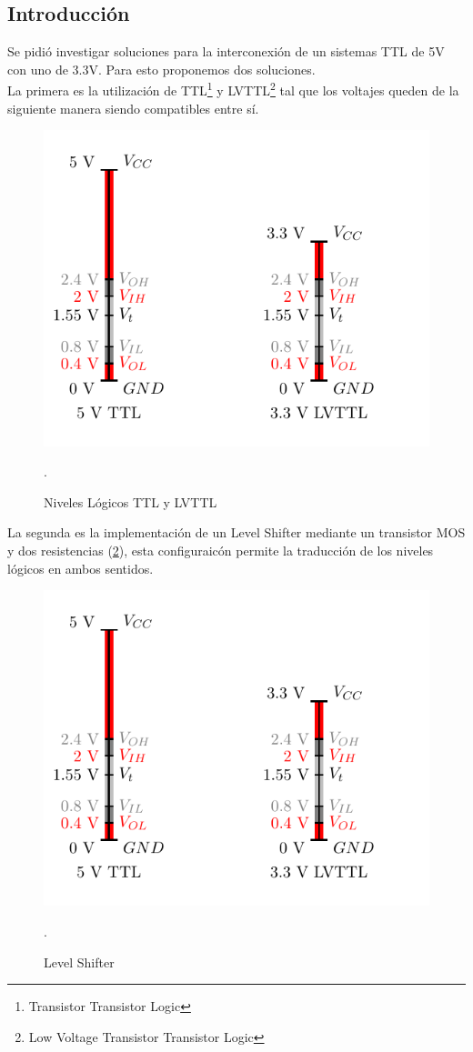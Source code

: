 



\subsection{Introducción}
Se pidió investigar soluciones para la interconexión de un sistemas TTL de 5V con uno de 3.3V. Para esto proponemos dos soluciones.\\
La primera es la utilización de TTL\footnote{Transistor Transistor Logic} y LVTTL\footnote{Low Voltage Transistor Transistor Logic} tal que los voltajes queden de la siguiente manera siendo compatibles entre sí.\\
\begin{figure}[H]
  \centering
  \includegraphics[width=.6\textwidth, page = 1]{ImagenesEjercicio4/Draw.pdf}
  \caption{Niveles Lógicos TTL y LVTTL}.
  \label{fig:ttlLvl}
\end{figure}
La segunda es la implementación de un Level Shifter mediante un transistor MOS y dos resistencias (\ref{fig:LVSH}), esta configuraicón permite la traducción de los niveles lógicos en ambos sentidos.
\begin{figure}[H]
  \centering
  \includegraphics[width=.6\textwidth, page = 2]{ImagenesEjercicio4/Draw.pdf}
  \caption{Level Shifter}.
  \label{fig:LVSH}
\end{figure}

